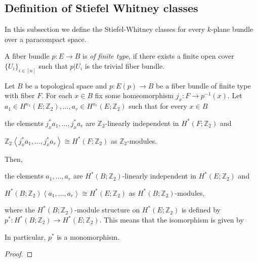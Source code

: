\subsection{Definition of Stiefel Whitney classes}
In this subsection we define the Stiefel-Whitney classes for every $k$-plane bundle over a paracompact space.
\begin{definition} A fiber bundle $p:E\to B$ is \emph{of finite type}, if there exists a finite open cover $\{U_i\}_{i\in[n]}$ such that $p|U_i$ is the trivial fiber bundle.
\end{definition}
\begin{theorem}\label{thm:leray_hirsch} Let $B$ be a topological space and $p:E(p)\to B$ be a fiber bundle of finite type with fiber $F$. For each $x\in B$ fix some homeomorphism $j_x:F\to p^{-1}(x)$. Let $a_1\in H^{n_1}(E;\mathbb{Z}_2),\ldots,a_r\in H^{n_r}(E;\mathbb{Z}_2)$ such that for every $x\in B$
\begin{b_item}
\item the elements $j_x^*a_1,\ldots,j_x^*a_r$ are $\mathbb{Z}_2$-linearly independent in $H^*(F;\mathbb{Z}_2)$ and
\item $\mathbb{Z}_2\left<j_x^*a_1,\ldots,j_x^*a_r\right>\cong H^*(F;\mathbb{Z}_2)$ as $\mathbb{Z}_2$-modules.
\end{b_item}
Then,
\begin{b_item}
\item the elements $a_1,\ldots,a_r$ are $H^*(B;\mathbb{Z}_2)$-linearly independent in $H^*(E;\mathbb{Z}_2)$ and
\item $H^*(B;\mathbb{Z}_2)\left<a_1,\ldots,a_r\right>\cong H^*(E;\mathbb{Z}_2)$ as $H^*(B;\mathbb{Z}_2)$-modules,
\end{b_item}
where the $H^*(B;\mathbb{Z}_2)$-module structure on $H^*(E;\mathbb{Z}_2)$ is defined by $p^*:H^*(B;\mathbb{Z}_2)\to H^*(E;\mathbb{Z}_2)$. This means that the isomorphism is given by
\begin{center}
\end{center}
In particular, $p^*$ is a monomorphism.
\end{theorem}
\begin{proof}
\end{proof}

